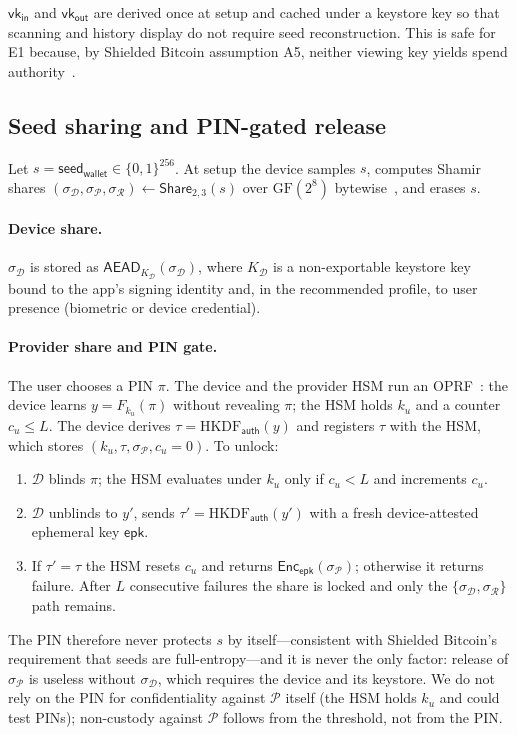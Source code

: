 \documentclass[11pt]{article}
\theoremstyle{remark}
\newcommand{\vk}{\mathsf{vk}}
\newcommand{\seed}{\mathsf{seed}_{\mathsf{wallet}}}
\newcommand{\SB}{Shielded Bitcoin}
\begin{document}
$\vk_{\mathsf{in}}$ and $\vk_{\mathsf{out}}$ are derived once at setup and cached under a keystore key so that scanning and history display do not require seed reconstruction. This is safe for E1 because, by \SB{} assumption A5, neither viewing key yields spend authority~\cite[§17]{sb26}.

\subsection{Seed sharing and PIN-gated release}
Let $s = \seed \in \{0,1\}^{256}$. At setup the device samples $s$, computes Shamir shares $(\sigma_{\mathcal{D}}, \sigma_{\mathcal{P}}, \sigma_{\mathcal{R}}) \leftarrow \mathsf{Share}_{2,3}(s)$ over $\mathrm{GF}(2^8)$ bytewise~\cite{shamir79}, and erases $s$.

\paragraph{Device share.} $\sigma_{\mathcal{D}}$ is stored as $\mathsf{AEAD}_{K_{\mathcal{D}}}(\sigma_{\mathcal{D}})$, where $K_{\mathcal{D}}$ is a non-exportable keystore key bound to the app's signing identity and, in the recommended profile, to user presence (biometric or device credential).

\paragraph{Provider share and PIN gate.} The user chooses a PIN $\pi$. The device and the provider HSM run an OPRF~\cite{opaque18}: the device learns $y = F_{k_u}(\pi)$ without revealing $\pi$; the HSM holds $k_u$ and a counter $c_u \le L$. The device derives $\tau = \mathrm{HKDF}_{\mathsf{auth}}(y)$ and registers $\tau$ with the HSM, which stores $(k_u, \tau, \sigma_{\mathcal{P}}, c_u{=}0)$. To unlock:
\begin{enumerate}
  \item $\mathcal{D}$ blinds $\pi$; the HSM evaluates under $k_u$ only if $c_u < L$ and increments $c_u$.
  \item $\mathcal{D}$ unblinds to $y'$, sends $\tau' = \mathrm{HKDF}_{\mathsf{auth}}(y')$ with a fresh device-attested ephemeral key $\mathsf{epk}$.
  \item If $\tau' = \tau$ the HSM resets $c_u$ and returns $\mathsf{Enc}_{\mathsf{epk}}(\sigma_{\mathcal{P}})$; otherwise it returns failure. After $L$ consecutive failures the share is locked and only the $\{\sigma_{\mathcal{D}}, \sigma_{\mathcal{R}}\}$ path remains.
\end{enumerate}
The PIN therefore never protects $s$ by itself---consistent with \SB{}'s requirement that seeds are full-entropy---and it is never the only factor: release of $\sigma_{\mathcal{P}}$ is useless without $\sigma_{\mathcal{D}}$, which requires the device and its keystore. We do not rely on the PIN for confidentiality against $\mathcal{P}$ itself (the HSM holds $k_u$ and could test PINs); non-custody against $\mathcal{P}$ follows from the threshold, not from the PIN.
\end{document}
